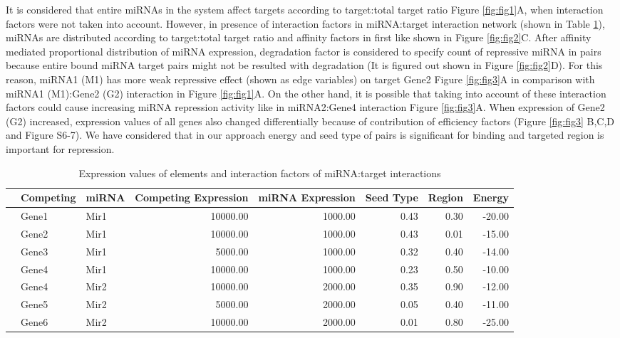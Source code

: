 \documentclass[a4,center,fleqn]{NAR}
\begin{document}
It is considered that entire miRNAs in the system affect targets
according to target:total target ratio Figure \ref{fig:fig1}A, when
interaction factors were not taken into account. However, in presence of
interaction factors in miRNA:target interaction network (shown in Table
\ref{tab:one}), miRNAs are distributed according to target:total target
ratio and affinity factors in first like shown in Figure
\ref{fig:fig2}C. After affinity mediated proportional distribution of
miRNA expression, degradation factor is considered to specify count of
repressive miRNA in pairs because entire bound miRNA target pairs might
not be resulted with degradation (It is figured out shown in Figure
\ref{fig:fig2}D). For this reason, miRNA1 (M1) has more weak repressive
effect (shown as edge variables) on target Gene2 Figure \ref{fig:fig3}A
in comparison with miRNA1 (M1):Gene2 (G2) interaction in Figure
\ref{fig:fig1}A. On the other hand, it is possible that taking into
account of these interaction factors could cause increasing miRNA
repression activity like in miRNA2:Gene4 interaction Figure
\ref{fig:fig3}A. When expression of Gene2 (G2) increased, expression
values of all genes also changed differentially because of contribution
of efficiency factors (Figure \ref{fig:fig3} B,C,D and Figure S6-7). We
have considered that in our approach energy and seed type of pairs is
significant for binding and targeted region is important for repression.

\begin{table}[ht]
\centering
\caption{Expression values of elements and interaction factors of miRNA:target interactions} 
\begin{tabular}{rllrrrrr}
  \hline
 & Competing & miRNA & Competing Expression & miRNA Expression & Seed Type & Region & Energy \\ 
  \hline
   & Gene1 & Mir1 & 10000.00 & 1000.00 & 0.43 & 0.30 & -20.00 \\ 
   & Gene2 & Mir1 & 10000.00 & 1000.00 & 0.43 & 0.01 & -15.00 \\ 
   & Gene3 & Mir1 & 5000.00 & 1000.00 & 0.32 & 0.40 & -14.00 \\ 
   & Gene4 & Mir1 & 10000.00 & 1000.00 & 0.23 & 0.50 & -10.00 \\ 
   & Gene4 & Mir2 & 10000.00 & 2000.00 & 0.35 & 0.90 & -12.00 \\ 
   & Gene5 & Mir2 & 5000.00 & 2000.00 & 0.05 & 0.40 & -11.00 \\ 
   & Gene6 & Mir2 & 10000.00 & 2000.00 & 0.01 & 0.80 & -25.00 \\ 
   \hline
\end{tabular}
\label{tab:one}
\end{table}
\end{document}
